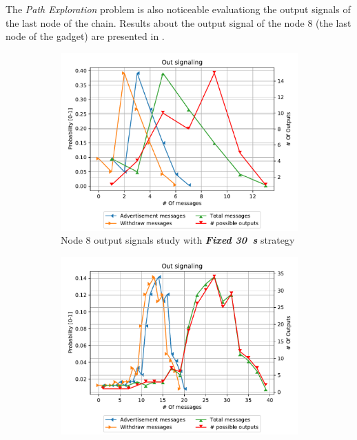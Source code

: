 The \textit{Path Exploration} problem is also noticeable evaluationg the
output signals of the last node of the chain.
Results about the output signal of the node \num{8} (the last node of the gadget)
are presented in .

\begin{figure}[h]
     \centering
     \begin{subfigure}[b]{0.32\textwidth}
         \centering
         \includegraphics[width=\textwidth]{images/signal_study/fabrikant/30Fixed.pdf}
		 \caption{Node \num{8} output signals study with \textbf{\textit{Fixed \SI{30}{\second}}} strategy}
         \label{fig:signal_node9_fabrikant_fixed30_noIW}
     \end{subfigure}
     \hfill
     \begin{subfigure}[b]{0.32\textwidth}
         \centering
         \includegraphics[width=\textwidth]{images/signal_study/fabrikant/Descendent.pdf}

\end{subfigure}
\end{figure}
